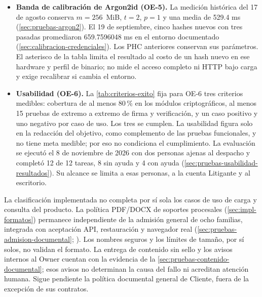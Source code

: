 \begin{itemize}
  \item \textbf{Banda de calibración de Argon2id (OE-5).} La medición histórica del 17 de agosto conserva $m = 256$~MiB, $t = 2$, $p = 1$ y una media de 529.4 ms (\cref{sec:pruebas-argon2}). El 19 de septiembre, cinco hashes nuevos con tres pasadas promediaron 659.7596048 ms en el entorno documentado (\cref{sec:calibracion-credenciales}). Los PHC anteriores conservan sus parámetros. El asterisco de la tabla limita el resultado al costo de un hash nuevo en ese hardware y perfil de binario; no mide el acceso completo ni HTTP bajo carga y exige recalibrar si cambia el entorno.
  \item \textbf{Usabilidad (OE-6).} La \cref{tab:criterios-exito} fija para OE-6 tres criterios medibles: cobertura de al menos 80\,\% en los módulos criptográficos, al menos 15 pruebas de extremo a extremo de firma y verificación, y un caso positivo y uno negativo por caso de uso. Los tres se cumplen. La usabilidad figura solo en la redacción del objetivo, como complemento de las pruebas funcionales, y no tiene meta medible; por eso no condiciona el cumplimiento. La evaluación se ejecutó el 8 de noviembre de 2026 con dos personas ajenas al despacho y completó 12 de 12 tareas, 8 sin ayuda y 4 con ayuda (\cref{sec:pruebas-usabilidad-resultados}). Su alcance se limita a esas personas, a la cuenta Litigante y al escritorio.
\end{itemize}

La clasificación implementada no completa por sí sola los casos de uso de carga y consulta del producto. La política PDF/DOCX de soportes procesales (\cref{sec:impl-formatos}) permanece independiente de la admisión general de ocho familias, integrada con aceptación API, restauración y navegador real (\cref{sec:pruebas-admision-documental}; ). Los nombres seguros y los límites de tamaño, por sí solos, no validan el formato. La entrega de contenido sin sello y los avisos internos al Owner cuentan con la evidencia de la \cref{sec:pruebas-contenido-documental}; esos avisos no determinan la causa del fallo ni acreditan atención humana. Sigue pendiente la política documental general de Cliente, fuera de la excepción de sus contratos.

